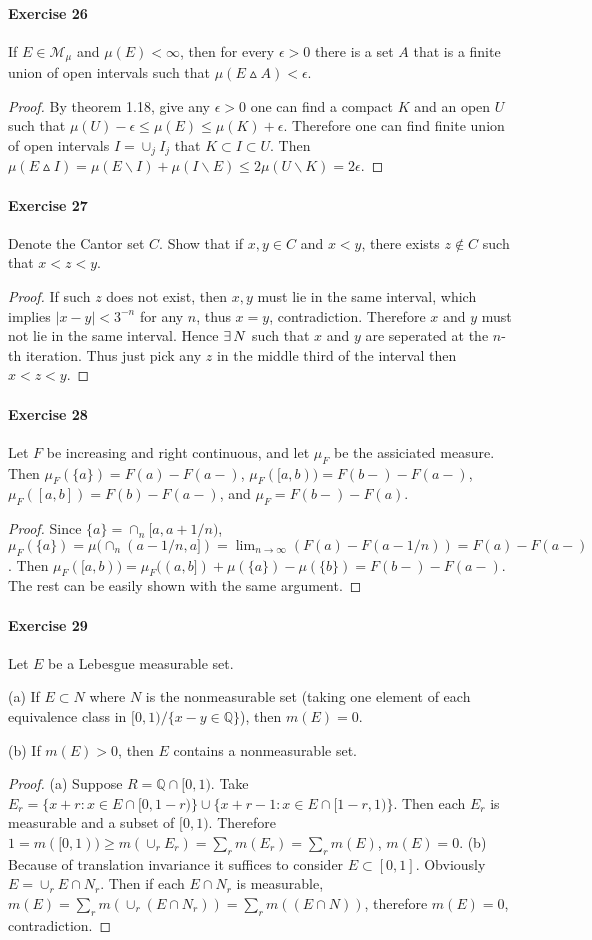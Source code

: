 \paragraph{Exercise 26}
If $E\in\mathcal{M}_\mu$ and $\mu(E)<\infty$, then for every $\epsilon>0$ there is a set $A$ that is a finite union of open intervals such that $\mu(E\vartriangle A)<\epsilon$.
\begin{proof}
    By theorem 1.18, give any $\epsilon>0$ one can find a compact $K$ and an open $U$ such that $\mu(U)-\epsilon\le\mu(E)\le\mu(K)+\epsilon$. Therefore one can find finite union of open intervals $I=\cup_j I_j$ that $K\subset I\subset U$. Then $\mu(E\vartriangle I)=\mu(E\backslash I)+\mu(I\backslash E)\le 2\mu(U\backslash K)=2\epsilon$. 
\end{proof}
\paragraph{Exercise 27}
Denote the Cantor set $C$. Show that if $x,y\in C$ and $x<y$, there exists $z\not\in C$ such that $x<z<y$.
\begin{proof}
    If such $z$ does not exist, then $x,y$ must lie in the same interval, which implies $|x-y|<3^{-n}$ for any $n$, thus $x=y$, contradiction. Therefore $x$ and $y$ must not lie in the same interval. Hence $\exists\, N$ such that $x$ and $y$ are seperated at the $n$-th iteration. Thus just pick any $z$ in the middle third of the interval then $x<z<y$.  
\end{proof}
\paragraph{Exercise 28}
Let $F$ be increasing and right continuous, and let $\mu_F$ be the assiciated measure. Then $\mu_F(\{a\})=F(a)-F(a-)$, $\mu_F([a,b))=F(b-)-F(a-)$, $\mu_F([a,b])=F(b)-F(a-)$, and $\mu_F=F(b-)-F(a)$.
\begin{proof}
    Since $\{a\}=\cap_n[a,a+1/n)$, $\mu_F(\{a\})=\mu(\cap_n(a-1/n,a])=\lim_{n\to\infty}(F(a)-F(a-1/n))=F(a)-F(a-)$. Then $\mu_F([a,b))=\mu_F((a,b])+\mu(\{a\})-\mu(\{b\})=F(b-)-F(a-)$. The rest can be easily shown with the same argument.
\end{proof}
\paragraph{Exercise 29}
Let $E$ be a Lebesgue measurable set.
\par (a) If $E\subset N$ where $N$ is the nonmeasurable set (taking one element of each equivalence class in $[0,1)/\{x-y\in\mathbb{Q}\}$), then $m(E)=0$.
\par (b) If $m(E)>0$, then $E$ contains a nonmeasurable set.
\begin{proof}
    (a) Suppose $R=\mathbb{Q}\cap[0,1)$. Take $E_r=\{x+r:x\in E\cap[0,1-r)\}\cup\{x+r-1:x\in E\cap[1-r,1)\}$. Then each $E_r$ is measurable and a subset of $[0,1)$. Therefore $1=m([0,1))\ge m(\cup_r E_r)=\sum_r m(E_r)=\sum_rm(E)$, $m(E)=0$.
    (b) Because of translation invariance it suffices to consider $E\subset[0,1]$. Obviously $E=\cup_{r}E\cap N_r$. Then if each $E\cap N_r$ is measurable, $m(E)=\sum_r m(\cup_r(E\cap N_r))=\sum_r m((E\cap N))$, therefore $m(E)=0$, contradiction.
\end{proof}
